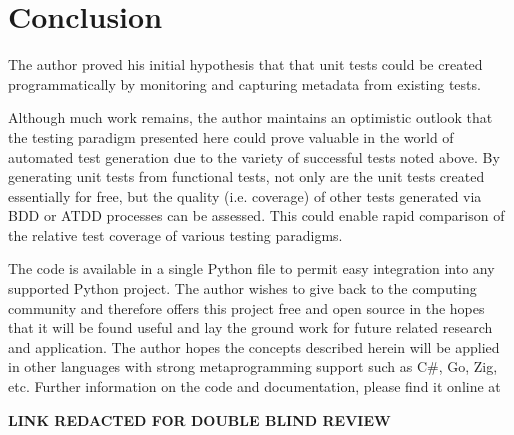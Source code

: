 \section{Conclusion}\label{sec:conclusion}

The author proved his initial hypothesis that 
that unit tests could be
created programmatically by monitoring and capturing 
metadata from existing tests.

Although much work remains, the author maintains an optimistic outlook
that the testing paradigm presented here could prove valuable in the 
world of automated test generation due to the variety of successful 
tests noted above.  By generating unit tests from functional tests, 
not only are the unit tests created essentially for free,
but the quality (i.e. coverage) of other tests generated via BDD or ATDD 
processes can be assessed. This could enable rapid comparison
of the relative test coverage of various testing paradigms.

The code is available in a single Python file to permit 
easy integration into any supported Python project.
The author wishes to give back to the computing community
and therefore offers this project free and open source
in the hopes that it will be found useful and lay the ground
work for future related research and application.
The author hopes the concepts described herein will be 
applied in other languages with strong metaprogramming support
such as C\#, Go, Zig, etc. Further information on the code and  documentation, please
find it online at
%
\begin{center}
  \textbf{LINK REDACTED FOR DOUBLE BLIND REVIEW}
\end{center}



